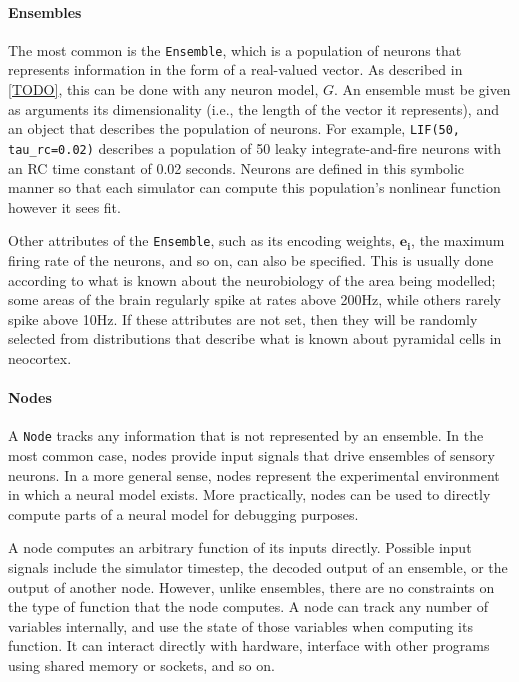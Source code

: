 \documentclass{frontiersSCNS}
\begin{document}
\paragraph{Ensembles}
The most common is the \texttt{Ensemble},
which is a population of neurons
that represents information
in the form of a real-valued vector.
As described in \eqref{TODO},
this can be done
with any neuron model, $G$.
An ensemble must be given as arguments
its dimensionality
(i.e., the length of the vector it represents),
and an object that describes
the population of neurons.
For example, \texttt{LIF(50, tau\_rc=0.02)}
describes a population
of 50 leaky integrate-and-fire neurons
with an RC time constant of 0.02 seconds.
Neurons are defined in this symbolic manner
so that each simulator can compute
this population's nonlinear function
however it sees fit.

Other attributes of the \texttt{Ensemble},
such as its encoding weights, $\mathbf{e_i}$,
the maximum firing rate of the neurons,
and so on, can also be specified.
This is usually done according
to what is known about
the neurobiology of the area being modelled;
some areas of the brain regularly spike
at rates above 200Hz,
while others rarely spike above 10Hz.
If these attributes are not set,
then they will be randomly selected
from distributions that describe
what is known about pyramidal cells in neocortex.


\paragraph{Nodes}
A \texttt{Node} tracks any information
that is not represented by an ensemble.
In the most common case,
nodes provide input signals
that drive ensembles of sensory neurons.
In a more general sense,
nodes represent the experimental environment
in which a neural model exists.
More practically,
nodes can be used to directly compute
parts of a neural model
for debugging purposes.

A node computes an arbitrary function
of its inputs directly.
Possible input signals include
the simulator timestep,
the decoded output of an ensemble,
or the output of another node.
However, unlike ensembles,
there are no constraints on the type
of function that the node computes.
A node can track any number of variables internally,
and use the state of those variables
when computing its function.
It can interact directly with hardware,
interface with other programs
using shared memory or sockets,
and so on.
\end{document}
